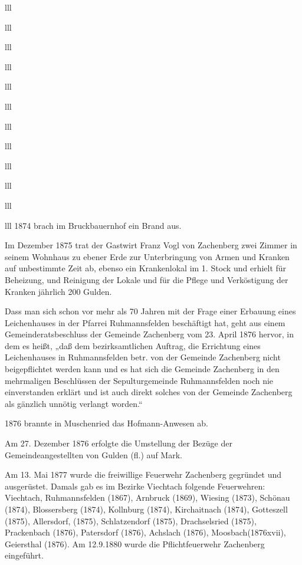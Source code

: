 \documentclass[12pt,a4pager]{book}
\begin{document}
\begin{tabuluar}{lll}
\begin{tabuluar}{lll}
\begin{tabuluar}{lll}
\begin{tabuluar}{lll}
\begin{tabuluar}{lll}
\begin{tabuluar}{lll}
\begin{tabuluar}{lll}
\begin{tabuluar}{lll}
\begin{tabuluar}{lll}
\begin{tabuluar}{lll}
\begin{tabuluar}{lll}
\begin{tabuluar}{lll}
1874 brach im Bruckbauernhof ein Brand aus.

Im Dezember 1875 trat der Gastwirt Franz Vogl von Zachenberg zwei Zimmer in
seinem Wohnhaus zu ebener Erde zur Unterbringung von Armen und Kranken auf
unbestimmte Zeit ab, ebenso ein Krankenlokal im 1. Stock und erhielt für
Beheizung, und Reinigung der Lokale und für die Pflege und Verköstigung der
Kranken jährlich 200 Gulden.

Dass man sich schon vor mehr als 70 Jahren mit der Frage einer Erbauung eines
Leichenhauses in der Pfarrei Ruhmannsfelden beschäftigt hat, geht aus einem
Gemeinderatsbeschluss der Gemeinde Zachenberg vom 23. April 1876 hervor, in dem
es heißt, „daß dem bezirksamtlichen Auftrag, die Errichtung eines Leichenhauses
in Ruhmannsfelden betr. von der Gemeinde Zachenberg nicht beigepflichtet werden
kann und es hat sich die Gemeinde Zachenberg in den mehrmaligen Beschlüssen der
Sepulturgemeinde Ruhmannsfelden noch nie einverstanden erklärt und ist auch
direkt solches von der Gemeinde Zachenberg als gänzlich unnötig verlangt
worden.“

1876 brannte in Muschenried das Hofmann-Anwesen ab.

Am 27. Dezember 1876 erfolgte die Umstellung der Bezüge der Gemeindeangestellten
von Gulden (fl.) auf Mark.

Am 13. Mai 1877 wurde die freiwillige Feuerwehr Zachenberg gegründet und
ausgerüstet. Damals gab es im Bezirke Viechtach folgende Feuerwehren: Viechtach,
Ruhmannsfelden (1867), Arnbruck (1869), Wiesing (1873), Schönau (1874),
Blossersberg (1874), Kollnburg (1874), Kirchaitnach (1874), Gotteszell (1875),
Allersdorf, (1875), Schlatzendorf (1875), Drachselsried (1875), Prackenbach
(1876), Patersdorf (1876), Achslach (1876), Moosbach(1876xvii), Geiersthal
(1876). Am 12.9.1880 wurde die Pflichtfeuerwehr Zachenberg eingeführt.


\end{tabuluar}
\end{tabuluar}
\end{tabuluar}
\end{tabuluar}
\end{tabuluar}
\end{tabuluar}
\end{tabuluar}
\end{tabuluar}
\end{tabuluar}
\end{tabuluar}
\end{tabuluar}
\end{tabuluar}
\end{document}
